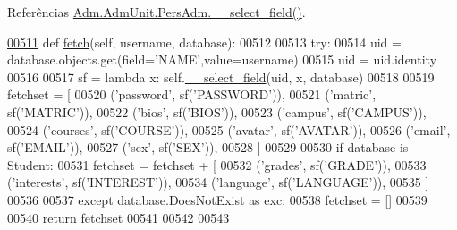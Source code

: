 Referências \hyperlink{AdmUnit_8py_source_l00495}{Adm.\+Adm\+Unit.\+Pers\+Adm.\+\_\+\+\_\+select\+\_\+field()}.


\begin{DoxyCode}
\hypertarget{classAdm_1_1AdmUnit_1_1PersAdm_l00511}{}\hyperlink{classAdm_1_1AdmUnit_1_1PersAdm_a0813f79d2ef26ab014c21f4ae2217045}{00511}     \textcolor{keyword}{def }\hyperlink{classAdm_1_1AdmUnit_1_1PersAdm_a0813f79d2ef26ab014c21f4ae2217045}{fetch}(self, username, database):
00512 
00513         \textcolor{keywordflow}{try}:
00514             uid = database.objects.get(field=\textcolor{stringliteral}{'NAME'},value=username)
00515             uid = uid.identity
00516 
00517             sf = \textcolor{keyword}{lambda} x: self.\hyperlink{classAdm_1_1AdmUnit_1_1PersAdm_aa30c5e73f6bfa1c525007624caebaaa3}{\_\_select\_field}(uid, x, database)
00518 
00519             fetchset = [
00520                     (\textcolor{stringliteral}{'password'},    sf(\textcolor{stringliteral}{'PASSWORD'})),
00521                     (\textcolor{stringliteral}{'matric'},      sf(\textcolor{stringliteral}{'MATRIC'})),
00522                     (\textcolor{stringliteral}{'bios'},        sf(\textcolor{stringliteral}{'BIOS'})),
00523                     (\textcolor{stringliteral}{'campus'},      sf(\textcolor{stringliteral}{'CAMPUS'})),
00524                     (\textcolor{stringliteral}{'courses'},     sf(\textcolor{stringliteral}{'COURSE'})),
00525                     (\textcolor{stringliteral}{'avatar'},      sf(\textcolor{stringliteral}{'AVATAR'})),
00526                     (\textcolor{stringliteral}{'email'},       sf(\textcolor{stringliteral}{'EMAIL'})),
00527                     (\textcolor{stringliteral}{'sex'},         sf(\textcolor{stringliteral}{'SEX'})),
00528             ]
00529 
00530             \textcolor{keywordflow}{if} database \textcolor{keywordflow}{is} Student:
00531                 fetchset = fetchset + [     
00532                     (\textcolor{stringliteral}{'grades'},      sf(\textcolor{stringliteral}{'GRADE'})),
00533                     (\textcolor{stringliteral}{'interests'},   sf(\textcolor{stringliteral}{'INTEREST'})),
00534                     (\textcolor{stringliteral}{'language'},    sf(\textcolor{stringliteral}{'LANGUAGE'})),
00535                 ]
00536 
00537         \textcolor{keywordflow}{except} database.DoesNotExist \textcolor{keyword}{as} exc:
00538             fetchset = []
00539 
00540         \textcolor{keywordflow}{return} fetchset
00541 
00542 
00543 \end{DoxyCode}
\hypertarget{classAdm_1_1AdmUnit_1_1PersAdm_a2b5453709dfc3b1c6e5f9f85dc61d228}{}
